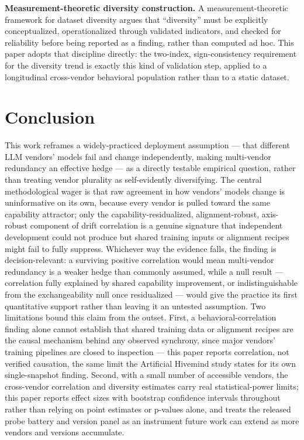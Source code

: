 \documentclass[11pt]{article}
\begin{document}
\textbf{Measurement-theoretic diversity construction.} A measurement-theoretic framework for dataset diversity \citep{MeasureDatasetDiversity} argues that ``diversity'' must be explicitly conceptualized, operationalized through validated indicators, and checked for reliability before being reported as a finding, rather than computed ad hoc. This paper adopts that discipline directly: the two-index, sign-consistency requirement for the diversity trend is exactly this kind of validation step, applied to a longitudinal cross-vendor behavioral population rather than to a static dataset.

\section{Conclusion}

This work reframes a widely-practiced deployment assumption --- that different LLM vendors' models fail and change independently, making multi-vendor redundancy an effective hedge --- as a directly testable empirical question, rather than treating vendor plurality as self-evidently diversifying. The central methodological wager is that raw agreement in how vendors' models change is uninformative on its own, because every vendor is pulled toward the same capability attractor; only the capability-residualized, alignment-robust, axis-robust component of drift correlation is a genuine signature that independent development could not produce but shared training inputs or alignment recipes might fail to fully suppress. Whichever way the evidence falls, the finding is decision-relevant: a surviving positive correlation would mean multi-vendor redundancy is a weaker hedge than commonly assumed, while a null result --- correlation fully explained by shared capability improvement, or indistinguishable from the exchangeability null once residualized --- would give the practice its first quantitative support rather than leaving it an untested assumption. Two limitations bound this claim from the outset. First, a behavioral-correlation finding alone cannot establish that shared training data or alignment recipes are the causal mechanism behind any observed synchrony, since major vendors' training pipelines are closed to inspection --- this paper reports correlation, not verified causation, the same limit the Artificial Hivemind study \citep{ArtificialHivemind} states for its own single-snapshot finding. Second, with a small number of accessible vendors, the cross-vendor correlation and diversity estimates carry real statistical-power limits; this paper reports effect sizes with bootstrap confidence intervals throughout rather than relying on point estimates or p-values alone, and treats the released probe battery and version panel as an instrument future work can extend as more vendors and versions accumulate.
\end{document}
